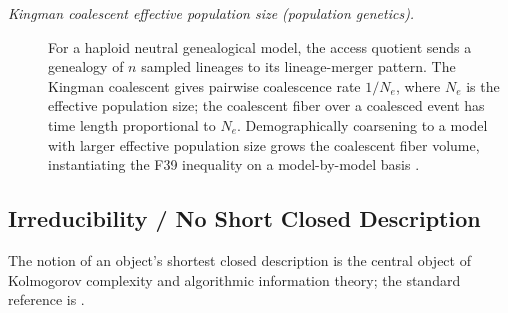 \documentclass[11pt]{article}
\theoremstyle{definition}
\begin{document}
\begin{description}
\item[\emph{Kingman coalescent effective population
size (population genetics).}]
For a haploid neutral genealogical model, the access
quotient sends a genealogy of \(n\) sampled lineages
to its lineage-merger pattern.  The Kingman coalescent
gives pairwise coalescence rate \(1/N_e\), where
\(N_e\) is the effective population size; the
coalescent fiber over a coalesced event has time
length proportional to \(N_e\).  Demographically
coarsening to a model with larger effective
population size grows the coalescent fiber volume,
instantiating the F39 inequality on a model-by-model
basis \citep{Kingman1982Coalescent}.
\end{description}

\subsection{Irreducibility / No Short Closed Description}\label{sec:self-reference-limits:irreducibility}

The notion of an object's shortest closed description is the central
object of Kolmogorov complexity and algorithmic information theory;
the standard reference is \citet{LiVitanyi2008Kolmogorov}.
\end{document}
